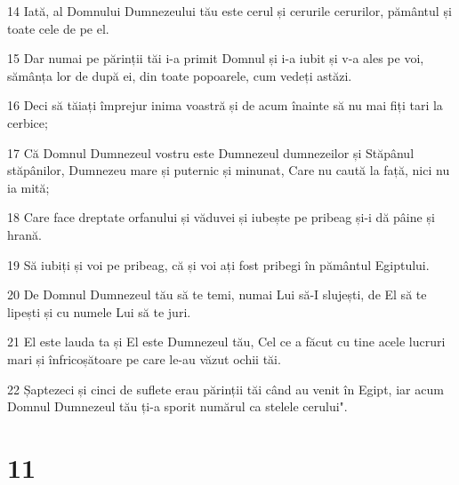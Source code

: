 \par 14 Iată, al Domnului Dumnezeului tău este cerul și cerurile cerurilor, pământul și toate cele de pe el.
\par 15 Dar numai pe părinții tăi i-a primit Domnul și i-a iubit și v-a ales pe voi, sămânța lor de după ei, din toate popoarele, cum vedeți astăzi.
\par 16 Deci să tăiați împrejur inima voastră și de acum înainte să nu mai fiți tari la cerbice;
\par 17 Că Domnul Dumnezeul vostru este Dumnezeul dumnezeilor și Stăpânul stăpânilor, Dumnezeu mare și puternic și minunat, Care nu caută la față, nici nu ia mită;
\par 18 Care face dreptate orfanului și văduvei și iubește pe pribeag și-i dă pâine și hrană.
\par 19 Să iubiți și voi pe pribeag, că și voi ați fost pribegi în pământul Egiptului.
\par 20 De Domnul Dumnezeul tău să te temi, numai Lui să-I slujești, de El să te lipești și cu numele Lui să te juri.
\par 21 El este lauda ta și El este Dumnezeul tău, Cel ce a făcut cu tine acele lucruri mari și înfricoșătoare pe care le-au văzut ochii tăi.
\par 22 Șaptezeci și cinci de suflete erau părinții tăi când au venit în Egipt, iar acum Domnul Dumnezeul tău ți-a sporit numărul ca stelele cerului".

\chapter{11}

